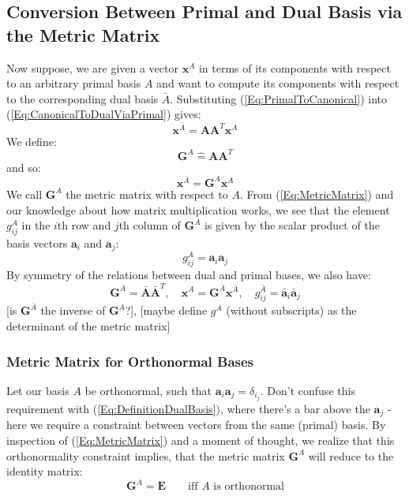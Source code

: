\subsection{Conversion Between Primal and Dual Basis via the Metric Matrix}
Now suppose, we are given a vector $\mathbf{x}^A$ in terms of its components with respect to an arbitrary primal basis $A$ and want to compute its components with respect to the corresponding dual basis $\bar{A}$. Substituting (\ref{Eq:PrimalToCanonical}) into (\ref{Eq:CanonicalToDualViaPrimal}) gives:
\begin{equation}
 \mathbf{x}^{\bar{A}} = \mathbf{A} \mathbf{A}^T  \mathbf{x}^A
\end{equation}
We define:
\begin{equation}
\label{Eq:MetricMatrix}
\boxed
{
 \mathbf{G}^{A} \hat{=} \mathbf{A} \mathbf{A}^T
}
\end{equation}
and so:
\begin{equation}
\label{Eq:PrimalToDualViaMetric}
 \mathbf{x}^{\bar{A}} = \mathbf{G}^{A} \mathbf{x}^A
\end{equation}
We call $\mathbf{G}^{A}$ the metric matrix with respect to $A$. From (\ref{Eq:MetricMatrix}) and our knowledge about how matrix multiplication works, we see that the element $g_{ij}^A$ in the $i$th row and $j$th column of $\mathbf{G}^{A}$ is given by the scalar product of the basis vectors $\mathbf{a}_i$ and $\mathbf{a}_j$:
\begin{equation}
 g_{ij}^A = \mathbf{a}_i \mathbf{a}_j
\end{equation}
By symmetry of the relations between dual and primal bases, we also have:
\begin{equation}
 \mathbf{G}^{\bar{A}} = \bar{\mathbf{A}} \bar{\mathbf{A}}^T, \quad
 \mathbf{x}^{A} = \mathbf{G}^{\bar{A}} \mathbf{x}^{\bar{A}}, \quad
 g_{ij}^{\bar{A}} = \bar{\mathbf{a}}_i \bar{\mathbf{a}}_j
\end{equation}
[is $\mathbf{G}^{\bar{A}}$ the inverse of $\mathbf{G}^{A}$?], [maybe define $g^A$ (without subscripts) as the determinant of the metric matrix]

\subsubsection{Metric Matrix for Orthonormal Bases}
Let our basis $A$ be orthonormal, such that $\mathbf{a}_i \mathbf{a}_j = \delta_{i_j}$. Don't confuse this requirement with (\ref{Eq:DefinitionDualBasis}), where there's a bar above the $\mathbf{a}_j$ - here we require a constraint between vectors from the same (primal) basis. By inspection of (\ref{Eq:MetricMatrix}) and a moment of thought, we realize that this orthonormality constraint implies, that the metric matrix $\mathbf{G}^{A}$ will reduce to the identity matrix:
\begin{equation}
 \mathbf{G}^{A} = \mathbf{E} \qquad \text{iff $A$ is orthonormal} 
\end{equation}

